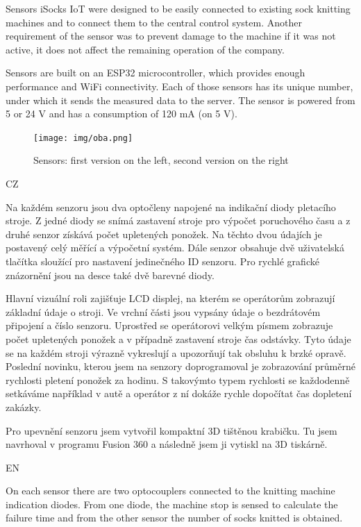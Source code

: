 \documentclass[12pt, a4paper]{article}
\begin{document}
Sensors iSocks IoT were designed to be easily connected to existing sock knitting machines and to connect them to the central control system.
Another requirement of the sensor was to prevent damage to the machine if it was not active, it does not affect the remaining operation of the company.

Sensors are built on an ESP32 microcontroller, which provides enough performance and WiFi connectivity.
Each of those sensors has its unique number, under which it sends the measured data to the server.
The sensor is powered from 5 or 24 V and has a consumption of 120 mA (on 5 V).

\begin{figure}[t]
    \centering
    \texttt{[image: img/oba.png]}
    \caption{Sensors: first version on the left, second version on the right}
    \label{fig:dveVerze}
\end{figure}

CZ

Na každém senzoru jsou dva optočleny napojené na indikační diody pletacího stroje.
Z jedné diody se snímá zastavení stroje pro výpočet poruchového času a z druhé senzor získává počet upletených ponožek.
Na těchto dvou údajích je postavený celý měřící a výpočetní systém.
Dále senzor obsahuje dvě uživatelská tlačítka sloužící pro nastavení jedinečného ID senzoru.
Pro rychlé grafické znázornění jsou na desce také dvě barevné diody.

Hlavní vizuální roli zajišťuje LCD displej, na kterém se operátorům zobrazují základní údaje o stroji.
Ve vrchní části jsou vypsány údaje o bezdrátovém připojení a číslo senzoru.
Uprostřed se operátorovi velkým písmem zobrazuje počet upletených ponožek a v případně zastavení stroje čas odstávky.
Tyto údaje se na každém stroji výrazně vykreslují a upozorňují tak obsluhu k brzké opravě.
Poslední novinku, kterou jsem na senzory doprogramoval je zobrazování průměrné rychlosti pletení ponožek za hodinu.
S takovýmto typem rychlosti se každodenně setkáváme například v autě a operátor z ní dokáže rychle dopočítat čas dopletení zakázky.

Pro upevnění senzoru jsem vytvořil kompaktní 3D tištěnou krabičku.
Tu jsem navrhoval v programu Fusion 360 a následně jsem ji vytiskl na 3D tiskárně.

EN

On each sensor there are two optocouplers connected to the knitting machine indication diodes.
From one diode, the machine stop is sensed to calculate the failure time and from the other sensor the number of socks knitted is obtained.
\end{document}
